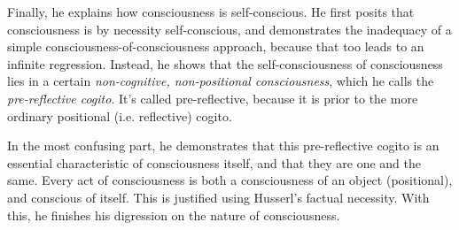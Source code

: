 Finally, he explains how consciousness is self-conscious. He first posits that consciousness is by necessity self-conscious, and demonstrates the inadequacy of a simple consciousness-of-consciousness approach, because that too leads to an infinite regression. Instead, he shows that the self-consciousness of consciousness lies in a certain \emph{non-cognitive, non-positional consciousness}, which he calls the \emph{pre-reflective cogito}. It's called pre-reflective, because it is prior to the more ordinary positional (i.e. reflective) cogito.

In the most confusing part, he demonstrates that this pre-reflective cogito is an essential characteristic of consciousness itself, and that they are one and the same. Every act of consciousness is both a consciousness of an object (positional), and conscious of itself. This is justified using Husserl's factual necessity. With this, he finishes his digression on the nature of consciousness.

